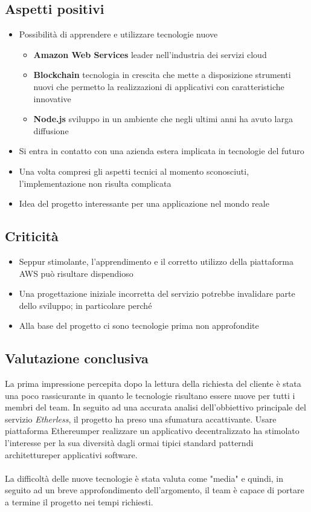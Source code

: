 \subsection{Aspetti positivi}
\begin{itemize}
	\item Possibilità di apprendere e utilizzare tecnologie nuove
		\begin{itemize}
			\item \textbf{Amazon Web Services} leader nell'industria dei servizi cloud
			\item \textbf{Blockchain} tecnologia in crescita che mette a disposizione strumenti nuovi che permetto la realizzazioni di applicativi con caratteristiche innovative
			\item \textbf{Node.js} sviluppo in un ambiente che negli ultimi anni ha avuto larga diffusione
		\end{itemize}
	\item Si entra in contatto con una azienda estera implicata in tecnologie del futuro
	\item Una volta compresi gli aspetti tecnici al momento sconosciuti, l'implementazione non risulta complicata
	\item Idea del progetto interessante per una applicazione nel mondo reale
\end{itemize}

\subsection{Criticità}
\begin{itemize}
	\item Seppur stimolante, l'apprendimento e il corretto utilizzo della piattaforma AWS può risultare dispendioso
	\item Una progettazione iniziale incorretta del servizio potrebbe invalidare parte dello sviluppo; in particolare perché
	\item Alla base del progetto ci sono tecnologie prima non approfondite
\end{itemize}

\subsection{Valutazione conclusiva}
La prima impressione percepita dopo la lettura della richiesta del cliente è stata una poco rassicurante in quanto le tecnologie risultano essere nuove per tutti i membri del team. In seguito ad una accurata analisi dell'obbiettivo principale del servizio \textit{Etherless}, il progetto ha preso una sfumatura accattivante. Usare piattaforma Ethereum\glo per realizzare un applicativo decentralizzato ha stimolato l'interesse per la sua diversità dagli ormai tipici standard pattern\glo di architetture\glo per applicativi software.
\\\\
La difficoltà delle nuove tecnologie è stata valuta come "media" e quindi, in seguito ad un breve approfondimento dell'argomento, il team è capace di portare a termine il progetto nei tempi richiesti.
